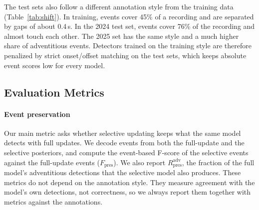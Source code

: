 The test sets also follow a different annotation style from the training data (Table~\ref{tab:shift}). In training, events cover 45\% of a recording and are separated by gaps of about 0.4\,s. In the 2024 test set, events cover 76\% of the recording and almost touch each other. The 2025 set has the same style and a much higher share of adventitious events. Detectors trained on the training style are therefore penalized by strict onset/offset matching on the test sets, which keeps absolute event scores low for every model.

\begin{table}[H]
\caption{Annotation statistics differ between releases (durations in seconds; median [interquartile range]).}
\label{tab:shift}
\centering
\setlength{\tabcolsep}{4pt}
\end{table}

\subsection{Evaluation Metrics}
\label{sec:metrics}
\paragraph*{Event preservation} Our main metric asks whether selective updating keeps what the same model detects with full updates. We decode events from both the full-update and the selective posteriors, and compute the event-based F-score of the selective events against the full-update events ($F_{\mathrm{pres}}$). We also report $R^{\mathrm{adv}}_{\mathrm{pres}}$, the fraction of the full model's adventitious detections that the selective model also produces. These metrics do not depend on the annotation style. They measure agreement with the model's own detections, not correctness, so we always report them together with metrics against the annotations.

